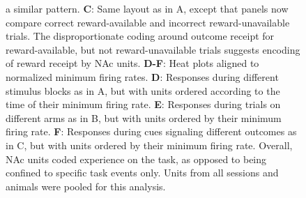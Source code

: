 \documentclass[11pt]{article}
\newcommand{\bsf}[1]{\textbf{#1}}
\providecommand{\DIFaddendFL}{} %
\DeclareRobustCommand{\DIFaddendFL}{\DIFOaddendFL \let\includegraphics\DIFOincludegraphics} %
\begin{document}
\begin{figure}[ht!]
{a similar pattern. \bsf{C}: Same layout as in A, except that panels now compare
correct reward-available and incorrect reward-unavailable trials. The disproportionate coding around outcome receipt for reward-available, but not reward-unavailable
trials suggests encoding of reward receipt by NAc units. \bsf{D-F}: Heat plots aligned to normalized minimum firing rates. \bsf{D}: Responses during different stimulus blocks as in A, but with units ordered according to
the time of their minimum firing rate. \bsf{E}: Responses during trials on different arms as in B, but with units ordered by their minimum
firing rate. \bsf{F}: Responses during cues signaling different outcomes as in C, but with units ordered by their minimum firing
rate. Overall, NAc units coded experience on the task, as opposed to being
confined to specific task events only. Units from all sessions and animals
were pooled for this analysis.}
\label{fig:NP_tiling}
\DIFaddendFL \end{figure} \clearpage


\end{document}
